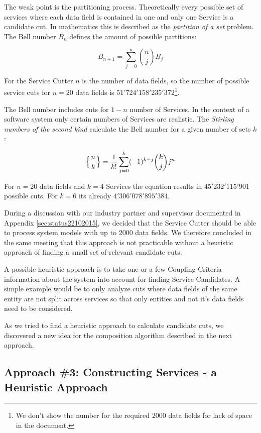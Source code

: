 The weak point is the partitioning process. Theoretically every possible set of services where each data field is contained in one and only one Service is a candidate cut. In mathematics this is described as the \textit{partition of a set}\cite{partitionOfASet} problem. The Bell number $B_n$ defines the amount of possible partitions: 


\begin{displaymath}
B_{n+1}=\sum_{j=0}^n {n\choose j} B_j
\end{displaymath}

For the Service Cutter $n$ is the number of data fields, so the number of possible service cuts for $n=20$ data fields is $51'724'158'235'372$\footnote{We don't show the number for the required $2000$ data fields for lack of space in the document.}.

The Bell number includes cuts for $1 - n$ number of Services. In the context of a software system only certain numbers of Services are realistic. The \textit{Stirling numbers of the second kind} calculate the Bell number for a given number of sets $k$:

\begin{displaymath}
\left\{ {n \atop k}\right\} = \frac{1}{k!}\sum_{j=0}^{k} (-1)^{k-j} \binom{k}{j} j^n
\end{displaymath}

For $n=20$ data fields and $k=4$ Services the equation results in $45'232'115'901$ possible cuts. For $k=6$ its already $4'306'078'895'384$.

During a discussion with our industry partner and supervisor documented in Appendix \ref{sec:status22102015}, we decided that the Service Cutter should be able to process system models with up to 2000 data fields. We therefore concluded in the same meeting that this approach is not practicable without a heuristic approach of finding a small set of relevant candidate cuts. 

A possible heuristic approach is to take one or a few Coupling Criteria information about the system into account for finding Service Candidates. A simple example would be to only analyze cuts where data fields of the same entity are not split across services so that only entities and not it's data fields need to be considered.

As we tried to find a heuristic approach to calculate candidate cuts, we discovered a new idea for the composition algorithm described in the next approach. 

\subsection{Approach \#3: Constructing Services - a Heuristic Approach}

